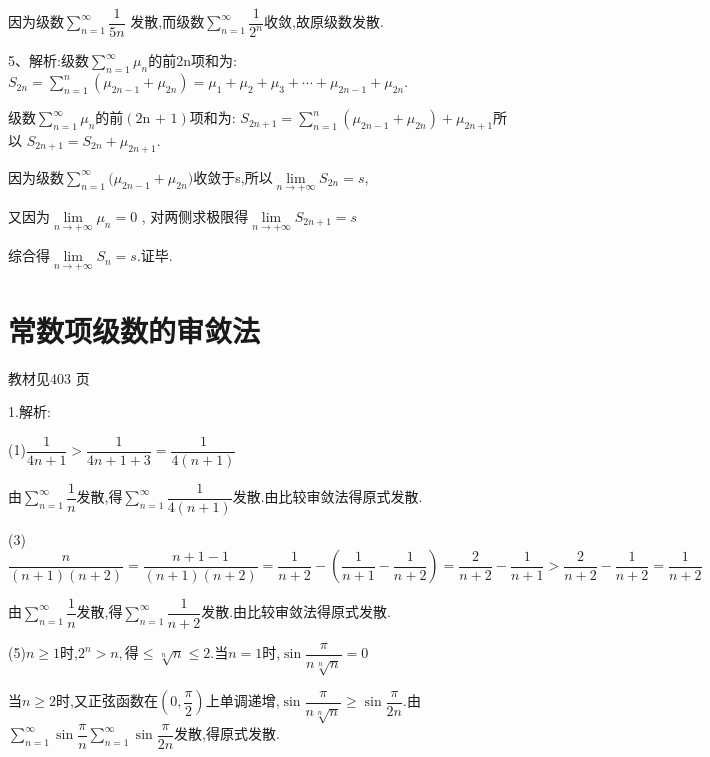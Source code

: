 因为级数$\sum\limits_{n = 1}^\infty  {\dfrac{1}{{5n}}} $ 发散,而级数$\sum\limits_{n = 1}^\infty  {\dfrac{1}{{{2^n}}}} $收敛,故原级数发散.

5、解析:级数$\sum\limits_{n = 1}^\infty  {{\mu _n}} $的前2n项和为:
${S_{2n}} = \sum\limits_{n = 1}^n {({\mu _{2n - 1}} + {\mu _{2n}})}  = {\mu _1} + {\mu _2} + {\mu _3} + \cdots + {\mu _{2n - 1}} + {\mu _{2n}}.$

级数$\sum\limits_{n = 1}^\infty  {{\mu _n}} $的前$\left( {2{\text{n + 1}}} \right)$项和为:
${S_{2n + 1}} = \sum\limits_{n = 1}^n {({\mu _{2n - 1}} + {\mu _{2n}})}  + {\mu _{2n + 1}}$所以 ${S_{2n + 1}} = {S_{2n}} + {\mu _{2n + 1}}$.

因为级数$\sum\limits_{n = 1}^\infty  {({\mu _{2n - 1}}}  + {\mu _{2n}})$收敛于s,所以$\lim\limits_{n \to +\infty} {S_{2n}} = s$,

又因为$\lim\limits_{n \to +\infty} {\mu _n} = 0$ ,
对两侧求极限得$\lim\limits_{n \to +\infty} {S_{2n + 1}} = s$

综合得$\lim\limits_{n \to +\infty} {S_n} = s$.证毕.


\section{常数项级数的审敛法}

\begin{flushright}
  \color{zhanqing!80}
   教材见403 页 %
\end{flushright}
1.解析:

(1)$\dfrac{1}{{4n + 1}} > \dfrac{1}{{4n + 1 + 3}} = \dfrac{1}{{4(n + 1)}}$

由$\sum\limits_{n = 1}^\infty  {\dfrac{1}{n}} $发散,得$\sum\limits_{n = 1}^\infty  {\dfrac{1}{{4(n + 1)}}} $发散.由比较审敛法得原式发散.

(3)$\dfrac{n}{{(n + 1)(n + 2)}} = \dfrac{{n + 1 - 1}}{{(n + 1)(n + 2)}} = \dfrac{1}{{n + 2}} - (\dfrac{1}{{n + 1}} - \dfrac{1}{{n + 2}}) = \dfrac{2}{{n + 2}} - \dfrac{1}{{n + 1}} > \dfrac{2}{{n + 2}} - \dfrac{1}{{n + 2}} = \dfrac{1}{{n + 2}}$

由$\sum\limits_{n = 1}^\infty  {\dfrac{1}{n}} $发散,得$\sum\limits_{n = 1}^\infty  {\dfrac{1}{{n + 2}}} $发散.由比较审敛法得原式发散.

(5)$n \geqslant 1$时,${2^n} > n,$得$\leqslant \sqrt[n]{n} \leqslant 2$.当$n = 1$时,$\sin \dfrac{\pi }{{n\sqrt[n]{n}}} = 0$

当$n \geqslant 2$时,又正弦函数在$(0,\dfrac{\pi }{2})$上单调递增,$\sin \dfrac{\pi }{{n\sqrt[n]{n}}} \geqslant \sin \dfrac{\pi }{{2n}}$.由$\sum\limits_{n = 1}^\infty  {\sin \dfrac{\pi }{n}} \sum\limits_{n = 1}^\infty  {\sin \dfrac{\pi }{{2n}}} $发散,得原式发散.

